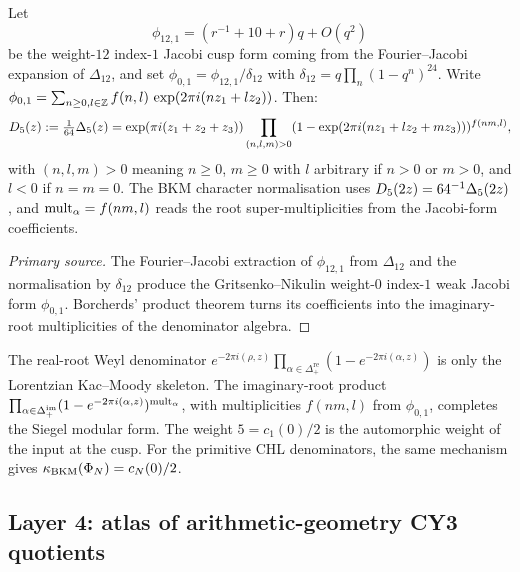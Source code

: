 \begin{theorem}
\label{thm:mult-phi01}
Let
\[
  \phi_{12,1}=(r^{-1}+10+r)q+O(q^2)
\]
be the weight-$12$ index-$1$ Jacobi cusp form coming from the
Fourier--Jacobi expansion of $\Delta_{12}$, and set
$\phi_{0,1} = \phi_{12,1}/\delta_{12}$ with
$\delta_{12} = q \prod_n (1 - q^n)^{24}$. Write
$\phi_{0,1} = \sum_{n \geq 0, l \in \mathbb{Z}} f(n, l)\, \exp(2\pi i(n z_1 + l z_2))$.
Then:
\[
  D_5(z):=\tfrac{1}{64}\Delta_5(z)
  = \exp(\pi i (z_1+z_2+z_3))
    \prod_{(n,l,m)>0}
    (1-\exp(2\pi i(nz_1+lz_2+mz_3)))^{f(nm,l)},
\]
with $(n,l,m) > 0$ meaning $n\geq0$, $m\geq0$ with $l$ arbitrary if
$n>0$ or $m>0$, and $l<0$ if $n=m=0$. The BKM character normalisation
uses $D_5(2z)=64^{-1}\Delta_5(2z)$, and
$\operatorname{mult}_\alpha=f(nm,l)$ reads the root super-multiplicities from the
Jacobi-form coefficients.
\end{theorem}

\begin{proof}[Primary source]
The Fourier--Jacobi extraction of $\phi_{12,1}$ from $\Delta_{12}$ and
the normalisation by $\delta_{12}$ produce the Gritsenko--Nikulin
weight-$0$ index-$1$ weak Jacobi form $\phi_{0,1}$. Borcherds'
product theorem turns its coefficients into the imaginary-root
multiplicities of the denominator algebra.
\end{proof}

\begin{remark}
The real-root Weyl denominator
$e^{-2\pi i(\rho, z)}\prod_{\alpha \in \Delta^{\mathrm{re}}_+}(1 - e^{-2\pi i(\alpha, z)})$
is only the Lorentzian Kac--Moody skeleton. The imaginary-root product
$\prod_{\alpha \in \Delta^{\mathrm{im}}_+}(1 - e^{-2\pi i(\alpha, z)})^{\operatorname{mult}_\alpha}$,
with multiplicities $f(nm,l)$ from $\phi_{0,1}$, completes the Siegel
modular form. The weight $5=c_1(0)/2$ is the automorphic weight of the
input at the cusp. For the primitive CHL denominators, the same
mechanism gives $\kappa_{\mathrm{BKM}}(\Phi_N)=c_N(0)/2$.
\end{remark}

\subsection{Layer 4: atlas of arithmetic-geometry CY3 quotients}
\label{subsec:atlas}

